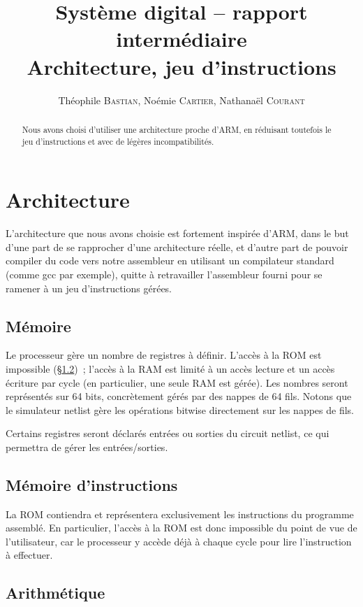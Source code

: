 \documentclass[11pt,a4paper]{article}
\author{Théophile \textsc{Bastian}, Noémie \textsc{Cartier}, Nathanaël \textsc{Courant}}
\title{Système digital -- rapport intermédiaire\\{\large Architecture, jeu d'instructions}}
\begin{document}
\maketitle

\begin{abstract}
Nous avons choisi d'utiliser une architecture proche d'ARM, en réduisant toutefois le jeu d'instructions et avec de légères incompatibilités.
\end{abstract}

\section{Architecture}

L'architecture que nous avons choisie est fortement inspirée d'ARM, dans le but d'une part de se rapprocher d'une architecture réelle, et d'autre part de pouvoir compiler du code vers notre assembleur en utilisant un compilateur standard (comme gcc par exemple), quitte à retravailler l'assembleur fourni pour se ramener à un jeu d'instructions gérées.

\subsection{Mémoire}\label{ssec:memory}

Le processeur gère un nombre de registres à définir. L'accès à la ROM est impossible (§\ref{ssec:mem_instruct})~; l'accès à la RAM est limité à un accès lecture et un accès écriture par cycle (en particulier, une seule RAM est gérée). Les nombres seront représentés sur 64 bits, concrètement gérés par des nappes de 64 fils. Notons que le simulateur netlist gère les opérations bitwise directement sur les nappes de fils.

Certains registres seront déclarés entrées ou sorties du circuit netlist, ce qui permettra de gérer les entrées/sorties.

\subsection{Mémoire d'instructions}\label{ssec:mem_instruct}

La ROM contiendra et représentera exclusivement les instructions du programme assemblé. En particulier, l'accès à la ROM est donc impossible du point de vue de l'utilisateur, car le processeur y accède déjà à chaque cycle pour lire l'instruction à effectuer.

\subsection{Arithmétique}
\end{document}
